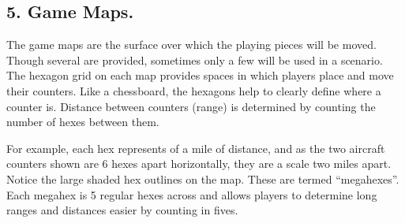\subsection{5. Game Maps.} The game maps are the surface over which the playing pieces will be moved. Though several are provided, sometimes only a few will be used in a scenario. The hexagon grid on each map provides spaces in which players place and move their counters. Like a chessboard, the hexagons help to clearly define where a counter is. Distance between counters (range) is determined by counting the number of hexes between them. 

For example,  each hex represents {\onethird} of a mile of distance, and as the two aircraft counters shown are 6 hexes apart horizontally, they are a scale two miles apart.
Notice the large shaded hex outlines on the map. These are termed “megahexes”. Each megahex is 5 regular hexes across and allows players to determine long ranges and distances easier by counting in fives.

